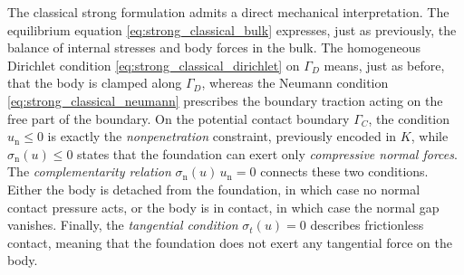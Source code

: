 The classical strong formulation admits a direct mechanical interpretation. The equilibrium equation \eqref{eq:strong_classical_bulk} expresses, just as previously, the balance of internal stresses and body forces in the bulk. The homogeneous Dirichlet condition \eqref{eq:strong_classical_dirichlet} on $\Gamma_D$ means, just as before, that the body is clamped along $\Gamma_D$, whereas the Neumann condition \eqref{eq:strong_classical_neumann} prescribes the boundary traction acting on the free part of the boundary. On the potential contact boundary $\Gamma_C$, the condition $u_{\mathrm n}\le 0$ is exactly the {\em nonpenetration} constraint, previously encoded in $K$, while $\sigma_{\mathrm n}(u)\le 0$ states that the foundation can exert only {\em compressive normal forces}. The {\em complementarity relation} $\sigma_{\mathrm n}(u)\,u_{\mathrm n}=0$ connects these two conditions. Either the body is detached from the foundation, in which case no normal contact pressure acts, or the body is in contact, in which case the normal gap vanishes. Finally, the {\em tangential condition} $\sigma_t(u)=0$ describes frictionless contact, meaning that the foundation does not exert any tangential force on the body.

